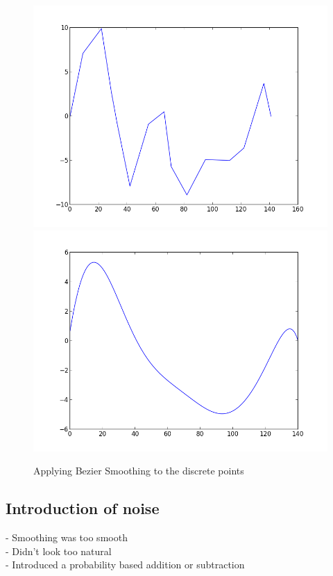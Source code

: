 \documentclass[bsc,frontabs,twoside,singlespacing,parskip]{infthesis}
\begin{document}
\begin{figure}
	\includegraphics[width=.6\textwidth]{figure_1.png}
	\includegraphics[width=.6\textwidth]{figure_2.png}
	\caption{Applying Bezier Smoothing to the discrete points}
\end{figure}

\subsection{Introduction of noise}
- Smoothing was too smooth\\
- Didn't look too natural \\
- Introduced a probability based addition or subtraction\\
\end{document}
